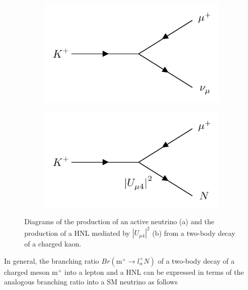 \begin{figure}[htbp!]
\begin{subfigure}[h]{0.4\linewidth}
\centering    
\includegraphics[width=\linewidth]{K_to_nu}
\caption{}
\end{subfigure}
\hfill
\begin{subfigure}[h]{0.4\linewidth}
\centering    
\includegraphics[width=\linewidth]{K_to_HNL}
\caption{}
\end{subfigure}%
\caption[kaonDiagram]{
Diagrams of the production of an active neutrino (a) and the production of a HNL mediated by $|U_{\mu4}|^{2}$ (b) from a two-body decay of a charged kaon.
}\label{fig:kaonDiagram}
\end{figure}

In general, the branching ratio $Br(\text{m}^{+}\rightarrow l^{+}_{\alpha}N)$ of a two-body decay of a charged meson $\text{m}^{+}$ into a lepton and a HNL can be expressed in terms of the analogous branching ratio into a SM neutrino as follows \cite{HNLKelly}

